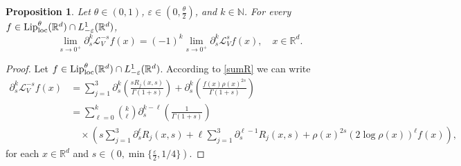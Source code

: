 \documentclass[10pt, a4paper, reqno]{amsart}
\newtheorem{prop}[thm]{Proposition}
\theoremstyle{definition}
\theoremstyle{remark}
\numberwithin{equation}{section}
\begin{document}
\begin{prop}\label{Prop2.6}
Let $\theta \in (0,1)$, $\varepsilon \in (0,\frac{\theta}{2})$,  and $k\in \mathbb N$. For every $f\in {\textup{Lip}}^\theta_{\rm loc}(\mathbb R^d)\cap L^1_{-\varepsilon }(\mathbb R^d)$, 
\[
\lim_{s\rightarrow 0^+}\partial_s^k\mathcal L_V^{-s}f(x)=(-1)^k\lim_{s\rightarrow 0^+}\partial _s^k\mathcal L_V^sf(x),\quad x\in \mathbb R^d.
\]
\end{prop}
\begin{proof}
Let $f\in {\textup{Lip}}_{\rm loc}^\theta (\mathbb R^d)\cap L^1_{-\varepsilon}(\mathbb R^d)$. According to \eqref{sumR} we can write
\begin{align*}
   \partial _s^k\mathcal L_V^{-s}f(x)&=\sum_{j=1}^3\partial_s^k\left(\frac{sR_j(x,s)}{\Gamma (1+s)}\right)+\partial_s^k\left(\frac{f(x)\rho(x)^{2s}}{\Gamma (1+s)}\right)\\
   &=\sum_{\ell =0}^k\binom{k}{\ell }\partial _s^{k-\ell}\left(\frac{1}{\Gamma (1+s)}\right)\\
    &\quad \times \left(s\sum_{j=1}^3\partial _s^\ell R_j(x,s)+\ell \sum_{j=1}^3 \partial _s^{\ell -1}R_j(x,s)+\rho (x)^{2s}(2\log \rho (x))^\ell f(x)\right),
\end{align*}
for each $x\in \mathbb R^d$ and $s\in (0,\min\{\tfrac{\varepsilon}{2},1/4\})$.


\end{proof}
\end{document}
